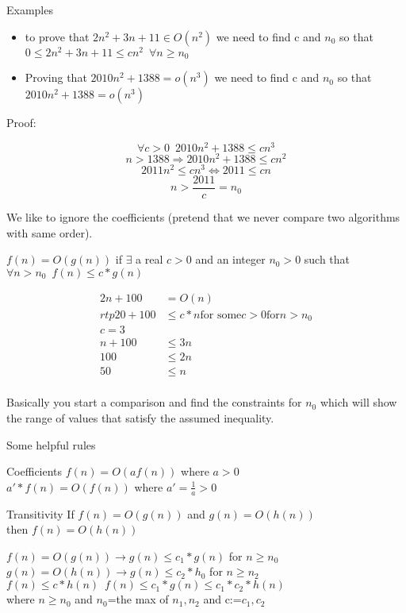 \documentclass[12pt]{article}
\begin{document}
Examples
\begin{itemize}
\item to prove that $2n^2+3n+11 \in O(n^2)$ we need to find c and $n_{0}$ so that $0 \leq 2n^2+3n+11 \leq cn^2 \enspace \forall n \geq n_{0}$
\end{itemize}


\begin{itemize}
\item Proving that $2010n^2+1388=o(n^3)$ we need to find c and $n_{0}$ so that $2010n^2+1388=o(n^3)$
\end{itemize}
\begin{center}
Proof:
\end{center}
$$\forall c>0 \enspace 2010n^2+1388 \leq cn^3$$
$$n>1388 \Rightarrow 2010n^2+1388 \leq cn^2$$
$$2011n^2 \leq cn^3 \Leftrightarrow 2011 \leq cn$$
$$n> \frac{2011}{c} = n_{0}$$

We like to ignore the coefficients (pretend that we never compare two algorithms with same order). 

$f(n)=O(g(n))$ if $\exists$ a real $c>0$ and an integer $n_{0}>0$ such that $\forall n>n_{0} \enspace f(n) \leq c*g(n)$

\begin{align*}
2n+100 &= O(n)\\
rtp 20 + 100 &\leq c*n \text{for some} c > 0 \text{for} n > n_{0} \\
c = 3 &\\
n + 100 &\leq 3n\\
100 &\leq 2n\\
50 &\leq n\\
\end{align*}

Basically you start a comparison and find the constraints for $n_{0}$ which will show the range of values that satisfy the assumed inequality.

Some helpful rules

Coefficients
$f(n) = O(af(n))$ where $a>0$\\
$a'*f(n) = O(f(n))$ where $a' = \frac{1}{a} > 0$  

Transitivity
If $f(n)=O(g(n))$ and $g(n)=O(h(n))$\\
then $f(n)=O(h(n))$

$f(n) = O(g(n)) \rightarrow g(n) \leq c_{1}*g(n)$ for $n \geq n_{0}$\\
$g(n) = O(h(n)) \rightarrow g(n) \leq c_{2}*h_{0}$ for $n \geq n_{2}$\\
$f(n) \leq c*h(n) \enspace f(n) \leq c_{1}*g(n) \leq c_{1}*c_{2}*h(n)$\\
where $n \geq n_{0}$ and $n_{0}$=the max of $n_{1}, n_{2}$ and c:=$c_{1},c_{2}$
\end{document}

